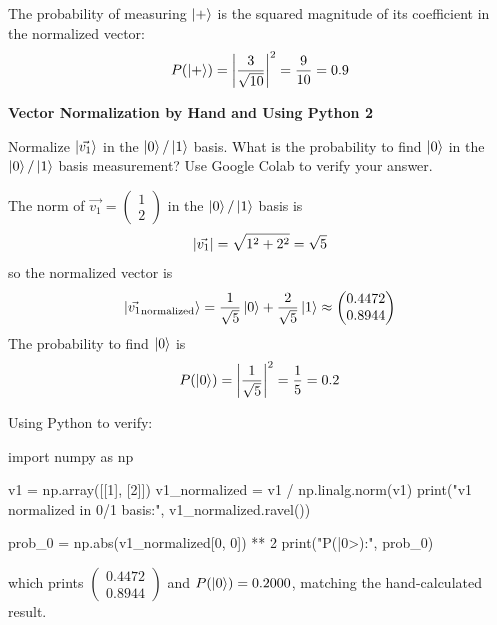 \documentclass[a4paper, 10pt]{article}
\begin{document}
\begin{solution}
	The probability of measuring \( \ket{+} \) is the squared magnitude of its coefficient in the normalized vector:
	\[
		P(\ket{+}) = \left|\frac{3}{\sqrt{10}}\right|^2 = \frac{9}{10} = 0.9
	\]
\end{solution}

\begin{problem}
\textbf{Vector Normalization by Hand and Using Python 2}
\par Normalize \( \ket{\vec{v_1}} \) in the \( \ket{0}/\ket{1} \) basis.
What is the probability to find \( \ket{0} \) in the \( \ket{0}/\ket{1} \) basis measurement?
Use Google Colab to verify your answer.
\end{problem}

\begin{solution}
	The norm of \( \vec{v_1} = \begin{pmatrix} 1 \\ 2 \end{pmatrix} \) in the \( \ket{0}/\ket{1} \) basis is
	\[
		\left|\vec{v_1}\right| = \sqrt{1^2 + 2^2} = \sqrt{5}
	\]
	so the normalized vector is
	\[
		\ket{\vec{v_1}_{\text{normalized}}} = \frac{1}{\sqrt{5}} \ket{0} + \frac{2}{\sqrt{5}} \ket{1}
		\approx \begin{pmatrix}
			0.4472 \\ 0.8944
		\end{pmatrix}
	\]
	The probability to find \( \ket{0} \) is
	\[
		P(\ket{0}) = \left|\frac{1}{\sqrt{5}}\right|^2 = \frac{1}{5} = 0.2
	\]

	\noindent Using Python to verify:
	\begin{codingbox*}
import numpy as np

v1 = np.array([[1], [2]])
v1_normalized = v1 / np.linalg.norm(v1)
print("v1 normalized in 0/1 basis:", v1_normalized.ravel())

prob_0 = np.abs(v1_normalized[0, 0]) ** 2
print("P(|0>):", prob_0)
\end{codingbox*}
	which prints \( \begin{pmatrix} 0.4472 \\ 0.8944 \end{pmatrix} \) and \( P(\ket{0}) = 0.2000 \), matching the hand-calculated result.
\end{solution}
\end{document}
